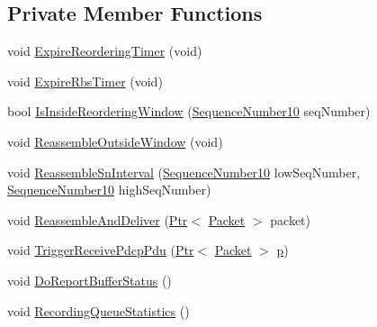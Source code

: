 \subsection*{Private Member Functions}
\begin{DoxyCompactItemize}
\item 
void \hyperlink{classns3_1_1LteRlcUmLowLat_a4b6265564058cc0626ad343269e2a5d3}{Expire\+Reordering\+Timer} (void)
\item 
void \hyperlink{classns3_1_1LteRlcUmLowLat_a8eca225145e752b4c8683f862319a684}{Expire\+Rbs\+Timer} (void)
\item 
bool \hyperlink{classns3_1_1LteRlcUmLowLat_aae57ed7d1b7b9bff39ac4e70cddfbd80}{Is\+Inside\+Reordering\+Window} (\hyperlink{classns3_1_1SequenceNumber10}{Sequence\+Number10} seq\+Number)
\item 
void \hyperlink{classns3_1_1LteRlcUmLowLat_a4443ee4ffdcbda9c568dafb97828497e}{Reassemble\+Outside\+Window} (void)
\item 
void \hyperlink{classns3_1_1LteRlcUmLowLat_aef0c71efceb98b3dd6c5bdbfc773ee0d}{Reassemble\+Sn\+Interval} (\hyperlink{classns3_1_1SequenceNumber10}{Sequence\+Number10} low\+Seq\+Number, \hyperlink{classns3_1_1SequenceNumber10}{Sequence\+Number10} high\+Seq\+Number)
\item 
void \hyperlink{classns3_1_1LteRlcUmLowLat_a73c311a5f9cb06e61282da24f875bb29}{Reassemble\+And\+Deliver} (\hyperlink{classns3_1_1Ptr}{Ptr}$<$ \hyperlink{classns3_1_1Packet}{Packet} $>$ packet)
\item 
void \hyperlink{classns3_1_1LteRlcUmLowLat_a50692b4467bf9cd91b0857bc11b19355}{Trigger\+Receive\+Pdcp\+Pdu} (\hyperlink{classns3_1_1Ptr}{Ptr}$<$ \hyperlink{classns3_1_1Packet}{Packet} $>$ \hyperlink{lte__link__budget__x2__handover__measures_8m_ac9de518908a968428863f829398a4e62}{p})
\item 
void \hyperlink{classns3_1_1LteRlcUmLowLat_a32175f318c6331be0fe77e8669c2d210}{Do\+Report\+Buffer\+Status} ()
\item 
void \hyperlink{classns3_1_1LteRlcUmLowLat_a870c248887c99b35ff6ab45b1f1d6002}{Recording\+Queue\+Statistics} ()
\end{DoxyCompactItemize}
